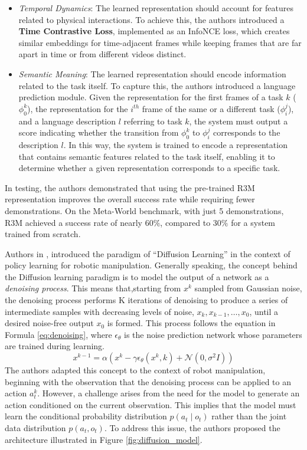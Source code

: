 \begin{itemize}
    \item \textit{Temporal Dynamics}: The learned representation should account for features related to physical interactions. To achieve this, the authors introduced a \textbf{Time Contrastive Loss}, implemented as an InfoNCE loss, which creates similar embeddings for time-adjacent frames while keeping frames that are far apart in time or from different videos distinct.
    \item \textit{Semantic Meaning}: The learned representation should encode information related to the task itself. To capture this, the authors introduced a language prediction module. Given the representation for the first frames of a task $k$ ($\phi^{k}_{0}$), the representation for the $i^{th}$ frame of the same or a different task ($\phi^{j}_{i}$), and a language description $l$ referring to task $k$, the system must output a score indicating whether the transition from $\phi^{k}_{0}$ to $\phi^{j}_{i}$ corresponds to the description $l$. In this way, the system is trained to encode a representation that contains semantic features related to the task itself, enabling it to determine whether a given representation corresponds to a specific task.
\end{itemize}

In testing, the authors demonstrated that using the pre-trained R3M representation improves the overall success rate while requiring fewer demonstrations. On the Meta-World benchmark, with just 5 demonstrations, R3M achieved a success rate of nearly \textbf{$60\%$}, compared to \textbf{$30\%$} for a system trained from scratch.


Authors in \cite{cheng2023diffusion}, introduced the paradigm of ``Diffusion Learning'' in the context of policy learning for robotic manipulation. Generally speaking, the concept behind the Diffusion learning paradigm is to model the output of a network as a \textit{denoising process}. This means that,starting from $x^k$ sampled from Gaussian noise, the denoising process performs K iterations of denoising to produce a series of intermediate samples with decreasing levels of noise, $x_k, x_{k-1}, \dots, x_0$, until a desired noise-free output $x_0$ is formed. This process follows the equation in Formula \ref{eq:denoising}, where $\epsilon_{\theta}$ is the noise prediction network whose parameters are trained during learning.
\begin{equation}
    \label{eq:denoising}
    x^{k-1} = \alpha \left( x^k - \gamma \epsilon_{\theta}(x^k, k) + \mathcal{N}(0, \sigma^{2}I)\right)
\end{equation}
The authors adapted this concept to the context of robot manipulation, beginning with the observation that the denoising process can be applied to an action $a_{t}^{k}$. However, a challenge arises from the need for the model to generate an action conditioned on the current observation. This implies that the model must learn the conditional probability distribution $p(a_t \mid o_t)$ rather than the joint data distribution $p(a_t, o_t)$. To address this issue, the authors proposed the architecture illustrated in Figure \ref{fig:diffusion_model}.

